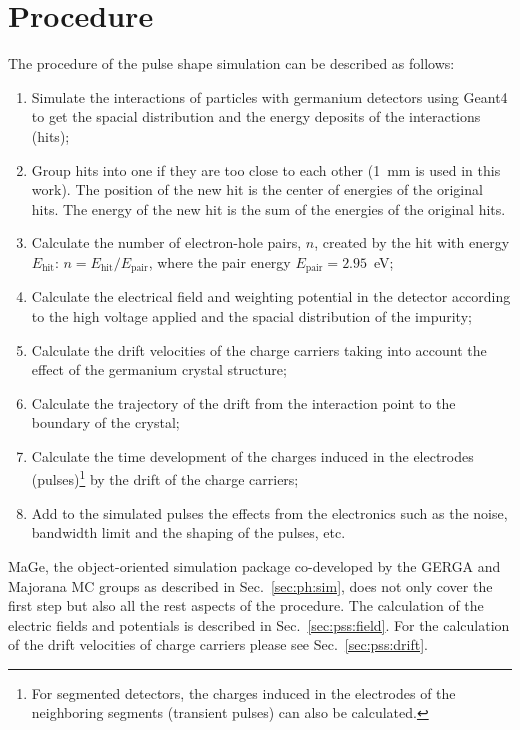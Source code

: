 \section{Procedure}
\label{sec:pss:proc}
The procedure of the pulse shape simulation\cite{agata} can be described as follows:
\begin{enumerate}
\item Simulate the interactions of particles with germanium detectors using Geant4 to get the spacial distribution and the energy deposits of the interactions (hits);
\item Group hits into one if they are too close to each other (1~mm is used in this work). The position of the new hit is the center of energies of the original hits. The energy of the new hit is the sum of the energies of the original hits.
\item Calculate the number of electron-hole pairs, $n$, created by the hit with energy $E_{\text{hit}}$: $n = E_{\text{hit}} / E_{\text{pair}}$, where the pair energy $E_{\text{pair}} = 2.95$~eV;
\item Calculate the electrical field and weighting potential\cite{Gat82, Rad88, He00} in the detector according to the high voltage applied and the spacial distribution of the impurity;
\item Calculate the drift velocities of the charge carriers taking into account the effect of the germanium crystal structure;
\item Calculate the trajectory of the drift from the interaction point to the boundary of the crystal;
\item Calculate the time development of the charges induced in the electrodes (pulses)\footnote{For segmented detectors, the charges induced in the electrodes of the neighboring segments (transient pulses) can also be calculated.} by the drift of the charge carriers\cite{igex}; 
\item Add to the simulated pulses the effects from the electronics such as the noise, bandwidth limit and the shaping of the pulses, etc.
\end{enumerate}
MaGe, the object-oriented simulation package co-developed by the GERGA and Majorana MC groups as described in Sec.~\ref{sec:ph:sim}, does not only cover the first step but also all the rest aspects of the procedure. The calculation of the electric fields and potentials is described in Sec.~\ref{sec:pss:field}. For the calculation of the drift velocities of charge carriers please see Sec.~\ref{sec:pss:drift}.


